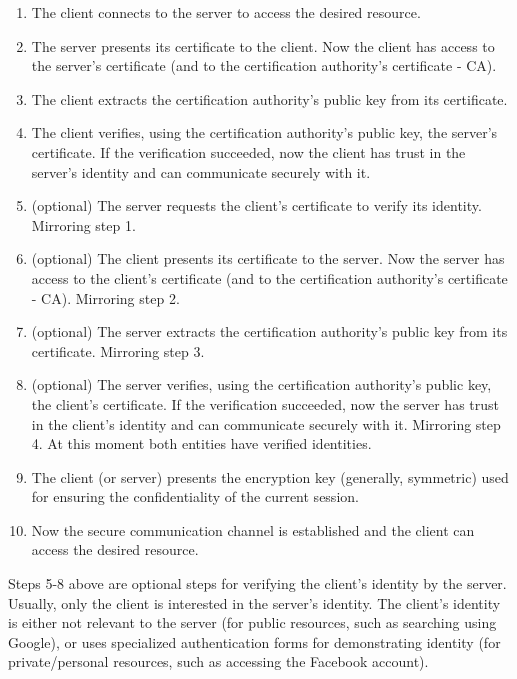 \begin{enumerate}
  \item The client connects to the server to access the desired resource.
  \item The server presents its certificate to the client.
    Now the client has access to the server's certificate (and to the certification authority's certificate - CA).
  \item The client extracts the certification authority's public key from its certificate.
  \item The client verifies, using the certification authority's public key, the server's certificate.
    If the verification succeeded, now the client has trust in the server's identity and can communicate securely with it.
  \item (optional) The server requests the client's certificate to verify its identity.
    Mirroring step 1.
  \item (optional) The client presents its certificate to the server.
    Now the server has access to the client's certificate (and to the certification authority's certificate - CA).
    Mirroring step 2.
  \item (optional) The server extracts the certification authority's public key from its certificate.
    Mirroring step 3.
  \item (optional) The server verifies, using the certification authority's public key, the client's certificate.
    If the verification succeeded, now the server has trust in the client's identity and can communicate securely with it.
    Mirroring step 4.
    At this moment both entities have verified identities.
  \item The client (or server) presents the encryption key (generally, symmetric) used for ensuring the confidentiality of the current session.
  \item Now the secure communication channel is established and the client can access the desired resource.
\end{enumerate}

Steps 5-8 above are optional steps for verifying the client's identity by the server.
Usually, only the client is interested in the server's identity.
The client's identity is either not relevant to the server (for public resources, such as searching using Google), or uses specialized authentication forms for demonstrating identity (for private/personal resources, such as accessing the Facebook account).

